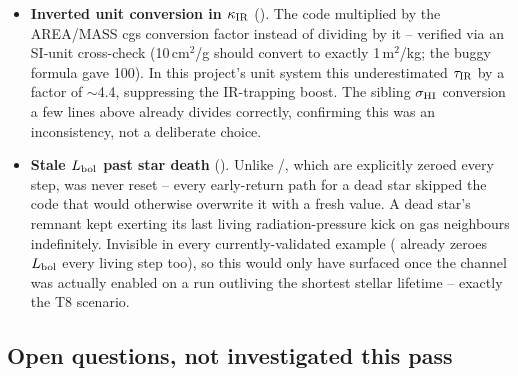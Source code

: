 \begin{itemize}
  \item \textbf{Inverted unit conversion in $\kappa_{\rm IR}$}
    (). The code multiplied by
    the AREA/MASS cgs conversion factor instead of dividing by it --
    verified via an SI-unit cross-check (10\,cm$^2$/g should convert to
    exactly 1\,m$^2$/kg; the buggy formula gave 100). In this project's
    unit system this underestimated $\tau_{\rm IR}$ by a factor of
    $\sim$4.4, suppressing the IR-trapping boost. The sibling
    $\sigma_{\rm HI}$ conversion a few lines above already divides
    correctly, confirming this was an inconsistency, not a deliberate
    choice.
  \item \textbf{Stale $L_{\rm bol}$ past star death}
    (). Unlike
    /, which
    are explicitly zeroed every step,  was never
    reset -- every early-return path for a dead star skipped the code
    that would otherwise overwrite it with a fresh value. A dead star's
    remnant kept exerting its last living radiation-pressure kick on gas
    neighbours indefinitely. Invisible in every currently-validated
    example ( already zeroes
    $L_{\rm bol}$ every living step too), so this would only have
    surfaced once the channel was actually enabled on a run outliving
    the shortest stellar lifetime -- exactly the T8 scenario.
\end{itemize}

\subsection{Open questions, not investigated this pass}
\label{sec:rp-open}

